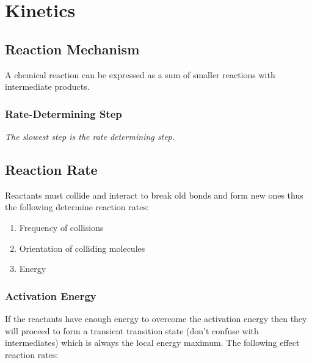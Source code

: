 \documentclass[../GChemReview.tex]{subfiles}
\begin{document}
	\chapter{Kinetics}
	
	\section{Reaction Mechanism}
	
	A chemical reaction can be expressed as a sum of smaller reactions with intermediate products.
	
	\subsection{Rate-Determining Step}
	
	\emph{The slowest step is the rate determining step.} 
	
	\section{Reaction Rate}
	
	Reactants must collide and interact to break old bonds and form new ones thus the following determine reaction rates:
	\begin{enumerate}
		\item Frequency of collisions
		\item Orientation of colliding molecules
		\item Energy
	\end{enumerate}
	
	\subsection{Activation Energy}
	
	If the reactants have enough energy to overcome the activation energy then they will proceed to form a transient transition state (don't confuse with intermediates) which is always the local energy maximum. The following effect reaction rates:
	\begin{center}
	\end{center}
	
\end{document}

